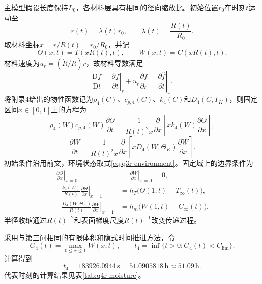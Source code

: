 主模型假设长度保持$L_0$，各材料层具有相同的径向缩放比。初始位置$r_0$在时刻$t$运动至
\begin{equation}
r(t)=\lambda(t)r_0,
\qquad
\lambda(t)=\frac{R(t)}{R_0}.
\label{eq:q4r-affine}
\end{equation}
取材料坐标$x=r/R(t)=r_0/R_0$，并记
\[
\Theta(x,t)=T(xR(t),t),
\qquad W(x,t)=C(xR(t),t).
\]
材料速度为$u_r=(\dot R/R)r$，故材料导数满足
\begin{equation}
\frac{\mathrm Df}{\mathrm Dt}
=\left.\frac{\partial f}{\partial t}\right|_r
+u_r\frac{\partial f}{\partial r}
=\left.\frac{\partial \widehat f}{\partial t}\right|_x.
\label{eq:q4r-material-derivative}
\end{equation}
将附录4给出的物性函数记为$\rho_4(C)$、$c_{p,4}(C)$、$k_4(C)$和$D_4(C,T_K)$，则固定区间$x\in[0,1]$上的方程为
\begin{equation}
\rho_4(W)c_{p,4}(W)\frac{\partial\Theta}{\partial t}
=\frac{1}{R(t)^2x}\frac{\partial}{\partial x}
\left[xk_4(W)\frac{\partial\Theta}{\partial x}\right],
\label{eq:q4r-heat}
\end{equation}
\begin{equation}
\frac{\partial W}{\partial t}
=\frac{1}{R(t)^2x}\frac{\partial}{\partial x}
\left[xD_4(W,\Theta_K)\frac{\partial W}{\partial x}\right].
\label{eq:q4r-moisture}
\end{equation}
初始条件沿用前文，环境状态取式\eqref{eq:q3r-environment}。固定域上的边界条件为
\begin{equation}
\begin{aligned}
\left.\frac{\partial\Theta}{\partial x}\right|_{x=0}
&=\left.\frac{\partial W}{\partial x}\right|_{x=0}=0,\\
-\frac{k_4(W)}{R(t)}\left.\frac{\partial\Theta}{\partial x}\right|_{x=1}
&=h_T\bigl(\Theta(1,t)-T_\infty(t)\bigr),\\
-\frac{D_4(W,\Theta_K)}{R(t)}\left.\frac{\partial W}{\partial x}\right|_{x=1}
&=h_m\bigl(W(1,t)-C_\infty(t)\bigr).
\end{aligned}
\label{eq:q4r-boundary}
\end{equation}
半径收缩通过$R(t)^{-2}$和表面梯度尺度$R(t)^{-1}$改变传递过程。

采用与第三问相同的有限体积和隐式时间推进方法，令
\begin{equation}
G_4(t)=\max_{0\le x\le1}W(x,t),
\qquad
t_4=\inf\{t>0:G_4(t)<C_{\mathrm{lim}}\}.
\label{eq:q4r-event}
\end{equation}
计算得到
\begin{equation}
\boxed{
t_4=183926.0944\,\mathrm s
=51.0905818\,\mathrm h
\approx51.09\,\mathrm h.
}
\label{eq:q4r-result}
\end{equation}
代表时刻的计算结果见表\ref{tab:q4r-moisture}。

